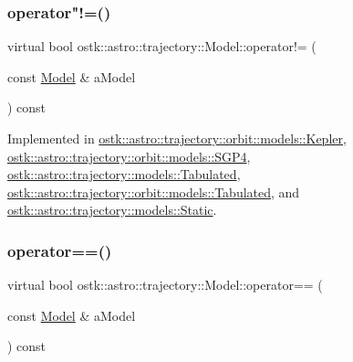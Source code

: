 \mbox{\label{classostk_1_1astro_1_1trajectory_1_1_model_a2dd77b9f6939d738f3a489f26c955340}} 
\subsubsection{\texorpdfstring{operator"!=()}{operator!=()}}
{\footnotesize\ttfamily virtual bool ostk\+::astro\+::trajectory\+::\+Model\+::operator!= (\begin{DoxyParamCaption}\item[{const \hyperlink{classostk_1_1astro_1_1trajectory_1_1_model}{Model} \&}]{a\+Model }\end{DoxyParamCaption}) const\hspace{0.3cm}{\ttfamily [pure virtual]}}



Implemented in \hyperlink{classostk_1_1astro_1_1trajectory_1_1orbit_1_1models_1_1_kepler_ab343575a423c5cecea4b21fa79c80726}{ostk\+::astro\+::trajectory\+::orbit\+::models\+::\+Kepler}, \hyperlink{classostk_1_1astro_1_1trajectory_1_1orbit_1_1models_1_1_s_g_p4_a87441104e4e1c63356abe0632b56edb6}{ostk\+::astro\+::trajectory\+::orbit\+::models\+::\+S\+G\+P4}, \hyperlink{classostk_1_1astro_1_1trajectory_1_1models_1_1_tabulated_a5e047165eb79ea50d257c2cb1bafc30d}{ostk\+::astro\+::trajectory\+::models\+::\+Tabulated}, \hyperlink{classostk_1_1astro_1_1trajectory_1_1orbit_1_1models_1_1_tabulated_a17610dc24fefecd03ae595cc78ef3079}{ostk\+::astro\+::trajectory\+::orbit\+::models\+::\+Tabulated}, and \hyperlink{classostk_1_1astro_1_1trajectory_1_1models_1_1_static_af85efc113db69c75c1afc7db0e81297b}{ostk\+::astro\+::trajectory\+::models\+::\+Static}.

\mbox{\label{classostk_1_1astro_1_1trajectory_1_1_model_a874f79846e845859c070ce1b9874fc9c}} 
\subsubsection{\texorpdfstring{operator==()}{operator==()}}
{\footnotesize\ttfamily virtual bool ostk\+::astro\+::trajectory\+::\+Model\+::operator== (\begin{DoxyParamCaption}\item[{const \hyperlink{classostk_1_1astro_1_1trajectory_1_1_model}{Model} \&}]{a\+Model }\end{DoxyParamCaption}) const\hspace{0.3cm}{\ttfamily [pure virtual]}}



